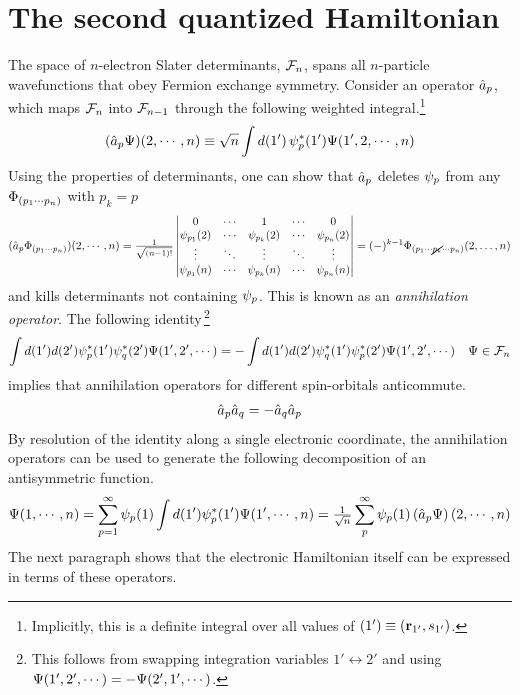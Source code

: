 \documentclass[11pt]{article}
\numberwithin{equation}{section}
\begin{document}
\setlength{\abovedisplayskip}{8pt}
\setlength{\belowdisplayskip}{8pt}

\setcounter{section}{1}
\section{The second quantized Hamiltonian}

The space of $n$-electron Slater determinants, $\mathcal{F}_n$, spans all $n$-particle wavefunctions that obey Fermion exchange symmetry.
Consider an operator $\hat{a}_p$, which maps $\mathcal{F}_n$ into $\mathcal{F}_{n-1}$ through the following weighted integral.\footnote{Implicitly, this is a definite integral over all values of $(1')\equiv(\mathbf{r}_{1'},s_{1'})$.}
\begin{align}
  (\hat{a}_p\Psi )(2,\cdots,n)
\equiv
  \sqrt{n}\int d(1')\, \psi _p^*(1')\Psi (1',2,\cdots,n)
\end{align}
Using the properties of determinants, one can show that $\hat{a}_p$ deletes $\psi _p$ from any $\Phi _{(p_1\cdots p_n)}$ with $p_k=p$
\begin{align}
  (\op{a}_p\F_{(p_1\cd p_n)})(2,\cd,n)
=
\tfr{1}{\sqrt{(n-1)!}}
\left|\ar{
  0 & \cd & 1 & \cd & 0\\
  \y_{p_1}(2) & \cd &\y_{p_k}(2)&\cd&\y_{p_n}(2)\\
  \vd  & \dd    &\vd    &\dd&\vd    \\
  \y_{p_1}(n) & \cd &\y_{p_k}(n)&\cd&\y_{p_n}(n)}\right|
=
  (-)^{k-1}\F_{(p_1\cd \cancel{p_k}\cd p_n)}(2,\ld,n)
\end{align}
and kills determinants not containing $\psi _p$.
This is known as an \textit{annihilation operator}.
The following identity\,\footnote{%
\label{fn:swap-integration-variables}%
  This follows from swapping integration variables $1'\leftrightarrow2'$ and using
  $
    \Psi (1',2',\cdots)
  =
  -
    \Psi (2',1',\cdots)
  $.
}
\begin{align}
\label{eq:spinorb-integrals-anticommute}
  \int d(1')d(2')\psi _p^*(1')\psi _q^*(2')\Psi (1',2',\cdots)
=
-
  \int d(1')d(2')\psi _q^*(1')\psi _p^*(2')\Psi (1',2',\cdots)
&&
  \Psi \in\mathcal{F}_n
\end{align}
implies that annihilation operators for different spin-orbitals anticommute.
\begin{align}
  \hat{a}_p
  \hat{a}_q
=
-
  \hat{a}_q
  \hat{a}_p
\end{align}
By resolution of the identity along a single electronic coordinate, the annihilation operators can be used to generate the following decomposition of an antisymmetric function.
\begin{align}
\label{eq:annihilation-operator-resolution-of-the-identity}
  \Psi (1,\cdots,n)
=
  \sum_{p=1}^\infty
  \psi _p(1)
  \int
  d(1')
  \psi _p^*(1')
  \Psi (1',\cdots,n)
=
  \tfrac{1}{\sqrt{n}}
  \sum_p^\infty\psi _p(1)\left(\hat{a}_p\Psi \right)(2,\cdots,n)
\end{align}
The next paragraph shows that the electronic Hamiltonian itself can be expressed in terms of these operators.
\end{document}

